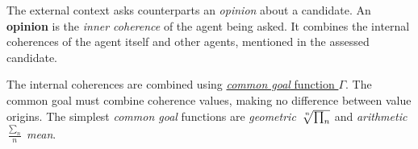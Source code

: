 \documentclass[../../ThesisDoc]{subfiles}
\begin{document}
\providecommand{\rootdir}{../..}

The external context asks counterparts an \emph{opinion} about a candidate.
An \textbf{opinion} is the \emph{inner coherence} of the agent being asked.
It combines the internal coherences of the agent itself and other agents,
mentioned in the assessed candidate.



The internal coherences are combined using
\underline{\emph{common goal} function $\Gamma$}.
The common goal must combine coherence values, making no difference
between value origins.
The simplest \emph{common goal} functions are \emph{geometric}
$\sqrt[\leftroot{-2}\uproot{2}n]{\prod_n}$
and \emph{arithmetic} $\frac{\sum_n}{n}$ \emph{mean}.


\end{document}
